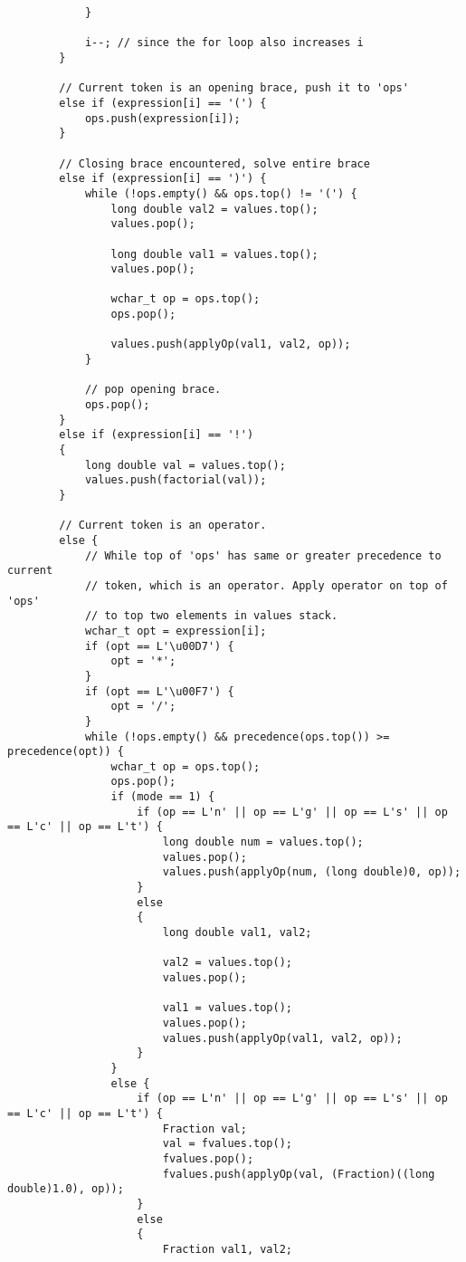 \begin{lstlisting}
            }
            
            i--; // since the for loop also increases i
        }

        // Current token is an opening brace, push it to 'ops'
        else if (expression[i] == '(') {
            ops.push(expression[i]);
        }

        // Closing brace encountered, solve entire brace
        else if (expression[i] == ')') {
            while (!ops.empty() && ops.top() != '(') {
                long double val2 = values.top();
                values.pop();

                long double val1 = values.top();
                values.pop();

                wchar_t op = ops.top();
                ops.pop();

                values.push(applyOp(val1, val2, op));
            }

            // pop opening brace.
            ops.pop();
        }
        else if (expression[i] == '!') 
        {
            long double val = values.top();
            values.push(factorial(val));
        }

        // Current token is an operator.
        else {
            // While top of 'ops' has same or greater precedence to current
            // token, which is an operator. Apply operator on top of 'ops'
            // to top two elements in values stack.
            wchar_t opt = expression[i];
            if (opt == L'\u00D7') {
                opt = '*';
            }
            if (opt == L'\u00F7') {
                opt = '/';
            }
            while (!ops.empty() && precedence(ops.top()) >= precedence(opt)) {
                wchar_t op = ops.top();
                ops.pop();
                if (mode == 1) {
                    if (op == L'n' || op == L'g' || op == L's' || op == L'c' || op == L't') {
                        long double num = values.top();
                        values.pop();
                        values.push(applyOp(num, (long double)0, op));
                    }
                    else
                    {
                        long double val1, val2;

                        val2 = values.top();
                        values.pop();

                        val1 = values.top();
                        values.pop();
                        values.push(applyOp(val1, val2, op));
                    }
                }
                else {
                    if (op == L'n' || op == L'g' || op == L's' || op == L'c' || op == L't') {
                        Fraction val;
                        val = fvalues.top();
                        fvalues.pop();
                        fvalues.push(applyOp(val, (Fraction)((long double)1.0), op));
                    }
                    else
                    {
                        Fraction val1, val2;


\end{lstlisting}
